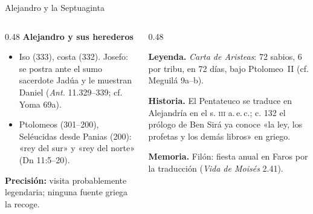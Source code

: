 \begin{frame}{Alejandro y la Septuaginta}
\begin{columns}[T,onlytextwidth]
\begin{column}{0.48\textwidth}\footnotesize
\textbf{\textcolor{ladrillo}{Alejandro y sus herederos}}
\begin{itemize}
\item Iso (333), costa (332). Josefo: se postra ante el sumo sacerdote Jadúa y le muestran Daniel (\emph{Ant.} 11.329--339; cf. Yoma 69a).
\item Ptolomeos (301--200), Seléucidas desde Panias (200): «rey del sur» y «rey del norte» (Dn 11:5--20).
\end{itemize}
\begin{clave}\textbf{Precisión:} visita probablemente legendaria; ninguna fuente griega la recoge.\end{clave}
\end{column}
\begin{column}{0.48\textwidth}
\begin{notalam}
\textbf{Leyenda.} \emph{Carta de Aristeas}: 72 sabios, 6 por tribu, en 72 días, bajo Ptolomeo~II (cf. Meguilá 9a--b).\par\smallskip
\textbf{Historia.} El Pentateuco se traduce en Alejandría en el s. \textsc{iii} a.\,e.\,c.; c. 132 el prólogo de Ben Sirá ya conoce «la ley, los profetas y los demás libros» en griego.\par\smallskip
\textbf{Memoria.} Filón: fiesta anual en Faros por la traducción (\emph{Vida de Moisés} 2.41).
\end{notalam}
\end{column}
\end{columns}
\end{frame}

